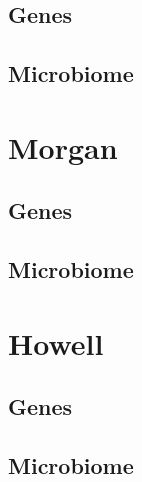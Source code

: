 \documentclass[
  12pt,
  a4paper,
  twoside,
  openright]{book}
\begin{document}
\hypertarget{genes-1}{%
\subsection{Genes}\label{genes-1}}

\hypertarget{microbiome-3}{%
\subsection{Microbiome}\label{microbiome-3}}

\hypertarget{morgan}{%
\section{Morgan}\label{morgan}}

\hypertarget{genes-2}{%
\subsection{Genes}\label{genes-2}}

\hypertarget{microbiome-4}{%
\subsection{Microbiome}\label{microbiome-4}}

\hypertarget{howell}{%
\section{Howell}\label{howell}}

\hypertarget{genes-3}{%
\subsection{Genes}\label{genes-3}}

\hypertarget{microbiome-5}{%
\subsection{Microbiome}\label{microbiome-5}}
\end{document}
